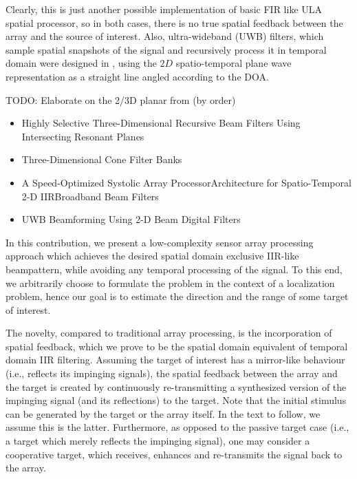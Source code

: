 Clearly, this is just another possible implementation of basic FIR like ULA spatial processor, so in both cases, there is no true spatial feedback between the array and the source of interest.
Also, ultra-wideband (UWB) filters, which sample spatial snapshots of the signal and recursively process it in temporal domain were designed in \cite{Hum2009BeamformingFilters}, using the $2D$ spatio-temporal plane wave representation as a straight line angled according to the DOA.
\par
TODO: Elaborate on the 2/3D planar from (by order)
\begin{itemize}
    \item Highly Selective Three-Dimensional Recursive Beam Filters Using Intersecting Resonant Planes 
    \item Three-Dimensional Cone Filter Banks
    \item A Speed-Optimized Systolic Array ProcessorArchitecture for Spatio-Temporal 2-D IIRBroadband Beam Filters
    \item UWB Beamforming Using 2-D Beam Digital Filters
\end{itemize}
\par In this contribution, we present a low-complexity sensor array processing approach which achieves the desired spatial domain exclusive IIR-like beampattern, while avoiding any temporal processing of the signal.
To this end, we arbitrarily choose to formulate the problem in the context of a localization problem, hence our goal is to estimate the direction and the range of some target of interest. 
\par The novelty, compared to traditional array processing, is the incorporation of spatial feedback, which we prove to be the spatial domain equivalent of temporal domain IIR filtering.
Assuming the target of interest has a mirror-like behaviour (i.e., reflects its impinging signals), the spatial feedback between the array and the target is created by continuously re-transmitting a synthesized version of the impinging signal (and its reflections) to the target.
Note that the initial stimulus can be generated by the target or the array itself. In the text to follow, we assume this is the latter. 
Furthermore, as opposed to the passive target case (i.e., a target which merely reflects the impinging signal), one may consider a cooperative target, which receives, enhances and re-transmits the signal back to the array. 
